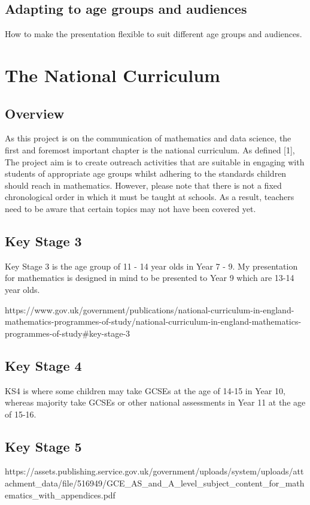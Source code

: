 \documentclass[12pt, a4paper,oneside]{book}
\numberwithin{equation}{section}
\begin{document}
\section{Adapting to age groups and audiences}

How to make the presentation flexible to suit different age groups and audiences.

\chapter{The National Curriculum}
\section{Overview}
As this project is on the communication of mathematics and data science, the first and foremost important chapter is the national curriculum. As defined [1], The project aim is to create outreach activities that are suitable in engaging with students of appropriate age groups whilst adhering to the standards children should reach in mathematics. However, please note that there is not a fixed chronological order in which it must be taught at schools. As a result, teachers need to be aware that certain topics may not have been covered yet.

\section{Key Stage 3}
Key Stage 3 is the age group of 11 - 14 year olds in Year 7 - 9. My presentation for mathematics is designed in mind to be presented to Year 9 which are 13-14 year olds.

https://www.gov.uk/government/publications/national-curriculum-in-england-mathematics-programmes-of-study/national-curriculum-in-england-mathematics-programmes-of-study#key-stage-3

\section{Key Stage 4}
KS4 is where some children may take GCSEs at the age of 14-15 in Year 10, whereas majority take GCSEs or other national assessments in Year 11 at the age of 15-16.

\section{Key Stage 5}
https://assets.publishing.service.gov.uk/government/uploads/system/uploads/attachment_data/file/516949/GCE_AS_and_A_level_subject_content_for_mathematics_with_appendices.pdf
\end{document}
